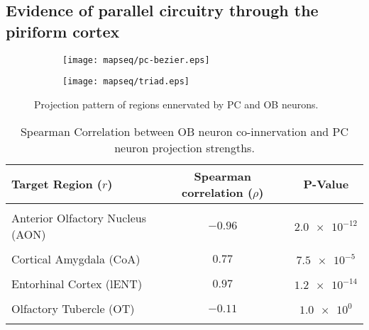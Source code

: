 \documentclass[../dissertation.tex]{subfiles}
\begin{document}
\subsection{Evidence of parallel circuitry through the piriform cortex}

\begin{figure}[p]
    \centering
    \begin{subfigure}[c]{\textwidth}
        \texttt{[image: mapseq/pc-bezier.eps]}
        \label{fig:circuit-bezier}
    \end{subfigure}

    \begin{subfigure}[c]{\textwidth}
        \texttt{[image: mapseq/triad.eps]}
        \label{fig:circuit-triad}
    \end{subfigure}

    \caption{Projection pattern of regions ennervated by PC and OB neurons.}
    \label{fig:circuit}
\end{figure}

\begin{table}
    \centering
    \begin{tabulary}{\linewidth}{@{}Lcc@{}}
        \toprule
        Target Region ($r$)                 & Spearman correlation ($\rho$) & P-Value \footnotemark
        \\ \midrule
        \\ Anterior Olfactory Nucleus (AON) & $\num{-0.96}$                 & $\num{2.0e-12}$   \\
        \\ Cortical Amygdala (CoA)          & $\num{0.77}$                  & $\num{7.5e-5}$    \\
        \\ Entorhinal Cortex (lENT)         & $\num{0.97}$                  & $\num{1.2e-14}$   \\
        \\ Olfactory Tubercle (OT)          & $\num{-0.11}$                 & $\num{1.0e0}$     \\
        \\ \bottomrule
    \end{tabulary}
    \caption{Spearman Correlation between OB neuron co-innervation and PC neuron projection strengths.}
    \label{tab:mapseq-obpc_Cor}
\end{table}
\end{document}

